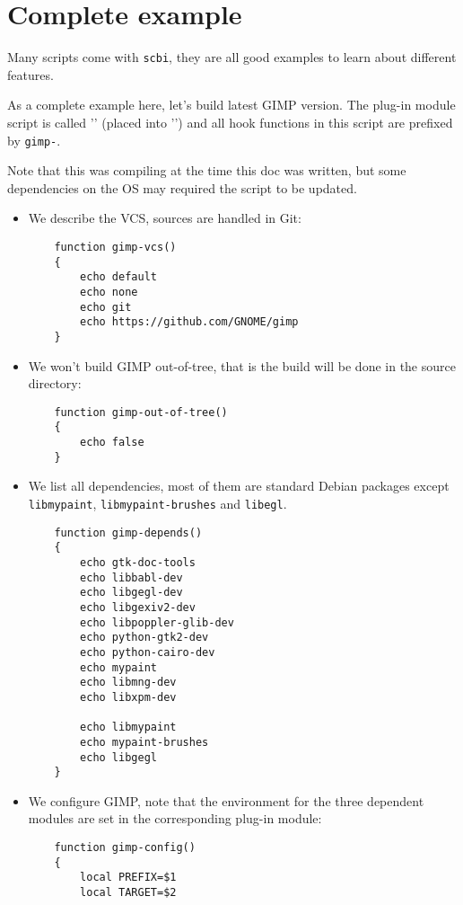 \documentclass[a4paper,12pt,twoside]{article}
\newcommand{\code}[1]{\texttt{#1}}
\newcommand{\file}[1]{'{\path{#1}}'}
\let\stdsection\section
\renewcommand\section{\newpage\stdsection}
\begin{document}
\section{Complete example}

Many scripts come with \code{scbi}, they are all good examples to learn about different features.

As a complete example here, let's build latest GIMP version. The plug-in module script is called \file{gimp} (placed into \file{$SCBI_DEFS/.config/scbi}) and all hook functions in this script are prefixed by \code{gimp-}.

Note that this was compiling at the time this doc was written, but some dependencies on the OS may required the script to be updated.

\begin{itemize}
	\item We describe the VCS, sources are handled in Git:

	\begin{lstlisting}
	function gimp-vcs()
	{
		echo default
		echo none
		echo git
		echo https://github.com/GNOME/gimp
	}
	\end{lstlisting}

	\item We won't build GIMP out-of-tree, that is the build will be done in the source directory:

	\begin{lstlisting}
	function gimp-out-of-tree()
	{
		echo false
	}
	\end{lstlisting}

	\item We list all dependencies, most of them are standard Debian packages except \code{libmypaint}, \code{libmypaint-brushes} and \code{libegl}.

	\begin{lstlisting}
	function gimp-depends()
	{
		echo gtk-doc-tools
		echo libbabl-dev
		echo libgegl-dev
		echo libgexiv2-dev
		echo libpoppler-glib-dev
		echo python-gtk2-dev
		echo python-cairo-dev
		echo mypaint
		echo libmng-dev
		echo libxpm-dev

		echo libmypaint
		echo mypaint-brushes
		echo libgegl
	}
	\end{lstlisting}

	\item We configure GIMP, note that the environment for the three dependent modules are set in the corresponding plug-in module:

	\begin{lstlisting}
	function gimp-config()
	{
		local PREFIX=$1
		local TARGET=$2


\end{lstlisting}
\end{itemize}
\end{document}
